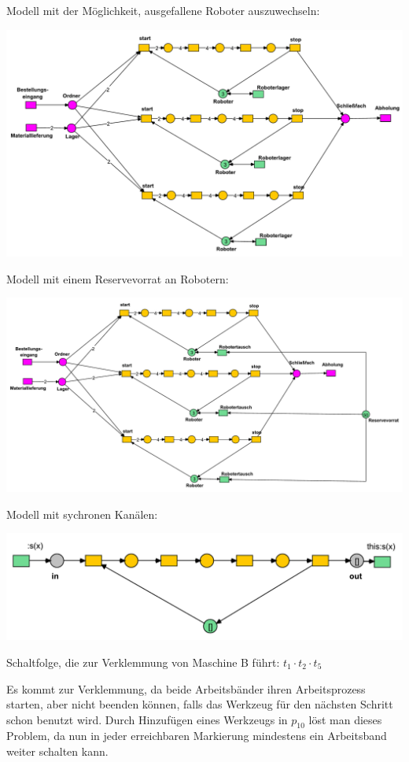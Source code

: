\documentclass[12pt,a4paper]{../krautsourcing/homework}
\begin{document}
\newpage

Modell mit der Möglichkeit, ausgefallene Roboter auszuwechseln:

\centerline{
\includegraphics[scale=0.45]{aufgabe-8-6/8-6-3-roboter-auswechselung.pdf}
}

Modell mit einem Reservevorrat an Robotern:

\centerline{
\includegraphics[scale=0.45]{aufgabe-8-6/8-6-4-roboter-reservevorrat.pdf}
}

Modell mit sychronen Kanälen:

\centerline{
\includegraphics[scale=0.50]{aufgabe-8-6/8-6-5-synchrone-kanaele.pdf}
}


Schaltfolge, die zur Verklemmung von Maschine B führt: \(t_1 \cdot t_2 \cdot t_5\)

Es kommt zur Verklemmung, da beide Arbeitsbänder ihren Arbeitsprozess starten, aber nicht beenden können, falls das Werkzeug für den nächsten Schritt schon benutzt wird. Durch Hinzufügen eines Werkzeugs in \(p_{10}\) löst man dieses Problem, da nun in jeder erreichbaren Markierung mindestens ein Arbeitsband weiter schalten kann.
\end{document}
